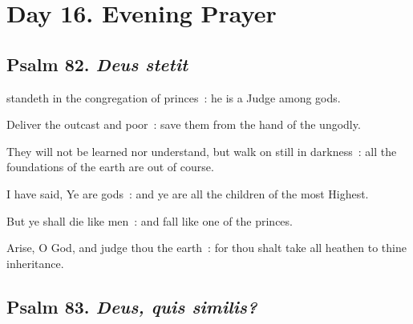 \section*{Day 16. Evening Prayer}

\subsection{Psalm 82. \textit{Deus stetit}}


 standeth in the congregation of princes~: he is a Judge among gods.\par
{}
Deliver the outcast and poor~: save them from the hand of the ungodly.\par
{}They will not be learned nor understand, but walk on still in darkness~: all the foundations of the earth are out of course.\par
{}I have said, Ye are gods~: and ye are all the children of the most Highest.\par
{}But ye shall die like men~: and fall like one of the princes.\par
{}Arise, O God, and judge thou the earth~: for thou shalt take all heathen to thine inheritance.\par

\subsection{Psalm 83. \textit{Deus, quis similis?}}



